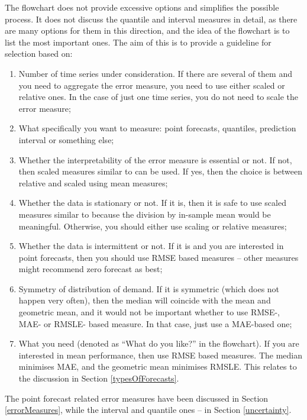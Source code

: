 \documentclass[
]{book}
\providecommand{\tightlist}{%
  \setlength{\itemsep}{0pt}\setlength{\parskip}{0pt}}
\theoremstyle{definition}
\theoremstyle{definition}
\theoremstyle{definition}
\theoremstyle{definition}
\theoremstyle{remark}
\begin{document}
The flowchart does not provide excessive options and simplifies the possible process. It does not discuss the quantile and interval measures in detail, as there are many options for them in this direction, and the idea of the flowchart is to list the most important ones. The aim of this is to provide a guideline for selection based on:

\begin{enumerate}
\def\labelenumi{\arabic{enumi}.}
\tightlist
\item
  Number of time series under consideration. If there are several of them and you need to aggregate the error measure, you need to use either scaled or relative ones. In the case of just one time series, you do not need to scale the error measure;
\item
  What specifically you want to measure: point forecasts, quantiles, prediction interval or something else;
\item
  Whether the interpretability of the error measure is essential or not. If not, then scaled measures similar to \citet{Hyndman2006} can be used. If yes, then the choice is between relative and scaled using mean measures;
\item
  Whether the data is stationary or not. If it is, then it is safe to use scaled measures similar to \citet{Petropoulos2015} because the division by in-sample mean would be meaningful. Otherwise, you should either use \citet{Hyndman2006} scaling or relative measures;
\item
  Whether the data is intermittent or not. If it is and you are interested in point forecasts, then you should use RMSE based measures -- other measures might recommend zero forecast as best;
\item
  Symmetry of distribution of demand. If it is symmetric (which does not happen very often), then the median will coincide with the mean and geometric mean, and it would not be important whether to use RMSE-, MAE- or RMSLE- based measure. In that case, just use a MAE-based one;
\item
  What you need (denoted as ``What do you like?'' in the flowchart). If you are interested in mean performance, then use RMSE based measures. The median minimises MAE, and the geometric mean minimises RMSLE. This relates to the discussion in Section \ref{typesOfForecasts}.
\end{enumerate}

The point forecast related error measures have been discussed in Section \ref{errorMeasures}, while the interval and quantile ones -- in Section \ref{uncertainty}.
\end{document}
